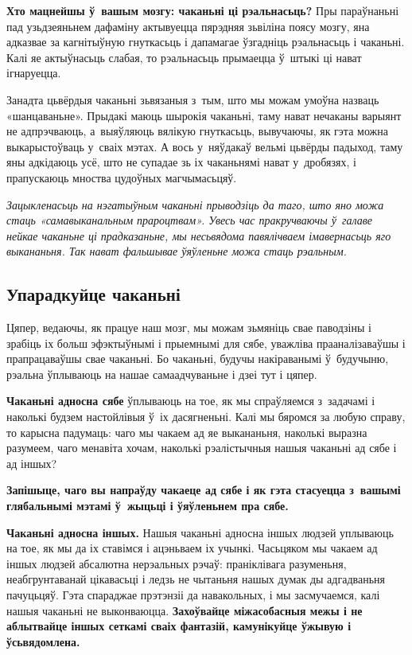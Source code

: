 \textbf{Хто мацнейшы ў~вашым мозгу: чаканьні ці рэальнасьць?} Пры параўнаньні пад узьдзеяньнем дафаміну актывуецца пярэдняя зьвіліна поясу мозгу, яна адказвае за кагнітыўную гнуткасьць і дапамагае ўзгадніць рэальнасьць і чаканьні. Калі яе актыўнасьць слабая, то рэальнасьць прымаецца ў~штыкі ці нават ігнаруецца.


Занадта цьвёрдыя чаканьні зьвязаныя з~тым, што мы можам умоўна назваць «шанцаваньне». Прыдакі маюць шырокія чаканьні, таму нават нечаканы варыянт не адпрэчваюць, а~выяўляюць вялікую гнуткасьць, вывучаючы, як гэта можна выкарыстоўваць у~сваіх мэтах. А вось у~няўдакаў вельмі цьвёрды падыход, таму яны адкідаюць усё, што не супадае зь іх чаканьнямі нават у~дробязях, і прапускаюць мноства цудоўных магчымасьцяў.

\emph{Зацыкленасьць на нэгатыўным чаканьні прыводзіць да таго, што яно можа стаць «самавыканальным прароцтвам». Увесь час пракручваючы ў~галаве нейкае чаканьне ці прадказаньне, мы несьвядома павялічваем імавернасьць яго выкананьня. Так нават фальшывае ўяўленьне можа стаць рэальным.}

\subsection*{Упарадкуйце чаканьні}

Цяпер, ведаючы, як працуе наш мозг, мы можам зьмяніць свае паводзіны і зрабіць іх больш эфэктыўнымі і прыемнымі для сябе, уважліва прааналізаваўшы і прапрацаваўшы свае чаканьні. Бо чаканьні, будучы накіраванымі ў~будучыню, рэальна ўплываюць на нашае самаадчуваньне і дзеі тут і цяпер.

\textbf{Чаканьні адносна сябе} ўплываюць на тое, як мы спраўляемся з~задачамі і наколькі будзем настойлівыя ў~іх дасягненьні. Калі мы бяромся за любую справу, то карысна падумаць: чаго мы чакаем ад яе выкананьня, наколькі выразна разумеем, чаго менавіта хочам, наколькі рэалістычныя нашыя чаканьні ад сябе і ад іншых?

\textbf{Запішыце, чаго вы напраўду чакаеце ад сябе і як гэта стасуецца з~вашымі глябальнымі мэтамі ў~жыцьці і ўяўленьнем пра сябе.}

\textbf{Чаканьні адносна іншых.} Нашыя чаканьні адносна іншых людзей уплываюць на тое, як мы да іх ставімся і ацэньваем іх учынкі. Часьцяком мы чакаем ад іншых людзей абсалютна нерэальных рэчаў: праніклівага разуменьня, неабгрунтаванай цікавасьці і ледзь не чытаньня нашых думак ды адгадваньня пачуцьцяў. Гэта спараджае прэтэнзіі да навакольных, і мы засмучаемся, калі нашыя чаканьні не выконваюцца. \textbf{Захоўвайце міжасобасныя межы і не аблытвайце іншых сеткамі сваіх фантазій, камунікуйце ўжывую і ўсьвядомлена.}

